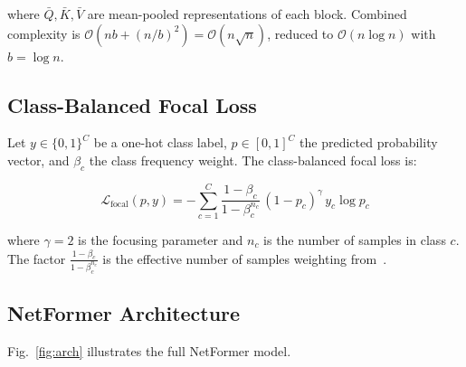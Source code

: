 \documentclass[conference]{IEEEtran}
\begin{document}
where $\bar{Q}, \bar{K}, \bar{V}$ are mean-pooled representations of
each block. Combined complexity is
$\mathcal{O}(nb + (n/b)^2) = \mathcal{O}(n\sqrt{n})$, reduced to
$\mathcal{O}(n \log n)$ with $b = \log n$.

\subsection{Class-Balanced Focal Loss}
\label{sec:loss}

Let $y \in \{0,1\}^C$ be a one-hot class label, $p \in [0,1]^C$ the
predicted probability vector, and $\beta_c$ the class frequency weight.
The class-balanced focal loss is:

\begin{equation}
	\mathcal{L}_{\text{focal}}(p, y) = -\sum_{c=1}^{C}
	\frac{1 - \beta_c}{1 - \beta_c^{n_c}}\,
	(1 - p_c)^\gamma\, y_c \log p_c
	\label{eq:focal}
\end{equation}

where $\gamma = 2$ is the focusing parameter and $n_c$ is the number
of samples in class $c$. The factor
$\tfrac{1-\beta_c}{1-\beta_c^{n_c}}$ is the effective number of
samples weighting from~\cite{ref:cui2019}.

\subsection{NetFormer Architecture}
\label{sec:netformer}

Fig.~\ref{fig:arch} illustrates the full NetFormer model.
\end{document}

